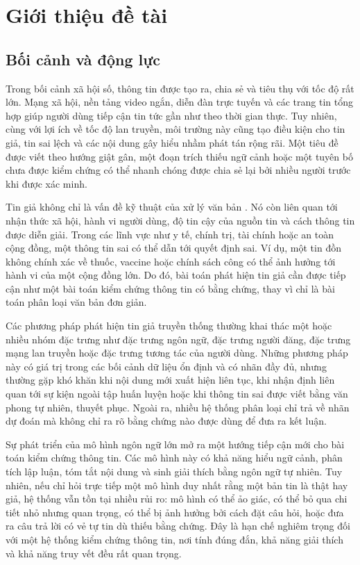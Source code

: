 ﻿\documentclass[oneside,a4paper,12pt]{extreport}
\begin{document}
\chapter{Giới thiệu đề tài}

\section{Bối cảnh và động lực}

Trong bối cảnh xã hội số, thông tin được tạo ra, chia sẻ và tiêu thụ với tốc độ rất lớn. Mạng xã hội, nền tảng video ngắn, diễn đàn trực tuyến và các trang tin tổng hợp giúp người dùng tiếp cận tin tức gần như theo thời gian thực. Tuy nhiên, cùng với lợi ích về tốc độ lan truyền, môi trường này cũng tạo điều kiện cho tin giả, tin sai lệch và các nội dung gây hiểu nhầm phát tán rộng rãi. Một tiêu đề được viết theo hướng giật gân, một đoạn trích thiếu ngữ cảnh hoặc một tuyên bố chưa được kiểm chứng có thể nhanh chóng được chia sẻ lại bởi nhiều người trước khi được xác minh.

Tin giả không chỉ là vấn đề kỹ thuật của xử lý văn bản \cite{vosoughi2018spread}. Nó còn liên quan tới nhận thức xã hội, hành vi người dùng, độ tin cậy của nguồn tin và cách thông tin được diễn giải. Trong các lĩnh vực như y tế, chính trị, tài chính hoặc an toàn cộng đồng, một thông tin sai có thể dẫn tới quyết định sai. Ví dụ, một tin đồn không chính xác về thuốc, vaccine hoặc chính sách công có thể ảnh hưởng tới hành vi của một cộng đồng lớn. Do đó, bài toán phát hiện tin giả cần được tiếp cận như một bài toán kiểm chứng thông tin có bằng chứng, thay vì chỉ là bài toán phân loại văn bản đơn giản.

Các phương pháp phát hiện tin giả truyền thống thường khai thác một hoặc nhiều nhóm đặc trưng như đặc trưng ngôn ngữ, đặc trưng người đăng, đặc trưng mạng lan truyền hoặc đặc trưng tương tác của người dùng. Những phương pháp này có giá trị trong các bối cảnh dữ liệu ổn định và có nhãn đầy đủ, nhưng thường gặp khó khăn khi nội dung mới xuất hiện liên tục, khi nhận định liên quan tới sự kiện ngoài tập huấn luyện hoặc khi thông tin sai được viết bằng văn phong tự nhiên, thuyết phục. Ngoài ra, nhiều hệ thống phân loại chỉ trả về nhãn dự đoán mà không chỉ ra rõ bằng chứng nào được dùng để đưa ra kết luận.

Sự phát triển của mô hình ngôn ngữ lớn mở ra một hướng tiếp cận mới cho bài toán kiểm chứng thông tin. Các mô hình này có khả năng hiểu ngữ cảnh, phân tích lập luận, tóm tắt nội dung và sinh giải thích bằng ngôn ngữ tự nhiên. Tuy nhiên, nếu chỉ hỏi trực tiếp một mô hình duy nhất rằng một bản tin là thật hay giả, hệ thống vẫn tồn tại nhiều rủi ro: mô hình có thể ảo giác, có thể bỏ qua chi tiết nhỏ nhưng quan trọng, có thể bị ảnh hưởng bởi cách đặt câu hỏi, hoặc đưa ra câu trả lời có vẻ tự tin dù thiếu bằng chứng. Đây là hạn chế nghiêm trọng đối với một hệ thống kiểm chứng thông tin, nơi tính đúng đắn, khả năng giải thích và khả năng truy vết đều rất quan trọng.
\end{document}
